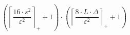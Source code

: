 \[\left(\left\lceil \frac{16 \cdot s^{2}}{\varepsilon^{2}} \right\rceil_{+} + 1\right) \cdot \left(\left\lceil \frac{8 \cdot L \cdot \Delta}{\varepsilon^{2}} \right\rceil_{+} + 1\right)\]
